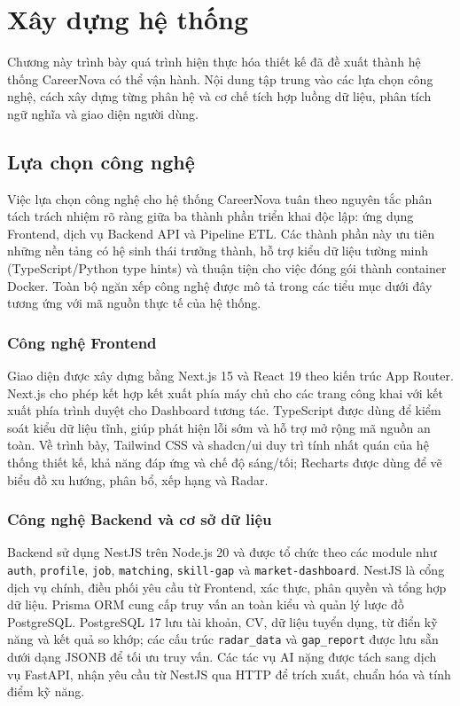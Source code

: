 \chapter{Xây dựng hệ thống}
\label{Chapter4}

Chương này trình bày quá trình hiện thực hóa thiết kế đã đề xuất thành hệ thống CareerNova có thể vận hành. Nội dung tập trung vào các lựa chọn công nghệ, cách xây dựng từng phân hệ và cơ chế tích hợp luồng dữ liệu, phân tích ngữ nghĩa và giao diện người dùng.

\section{Lựa chọn công nghệ}

Việc lựa chọn công nghệ cho hệ thống CareerNova tuân theo nguyên tắc phân tách trách nhiệm rõ ràng giữa ba thành phần triển khai độc lập: ứng dụng Frontend, dịch vụ Backend API và Pipeline ETL. Các thành phần này ưu tiên những nền tảng có hệ sinh thái trưởng thành, hỗ trợ kiểu dữ liệu tường minh (TypeScript/Python type hints) và thuận tiện cho việc đóng gói thành container Docker. Toàn bộ ngăn xếp công nghệ được mô tả trong các tiểu mục dưới đây tương ứng với mã nguồn thực tế của hệ thống.

\subsection{Công nghệ Frontend}

Giao diện được xây dựng bằng Next.js 15 và React 19 theo kiến trúc App Router. Next.js cho phép kết hợp kết xuất phía máy chủ cho các trang công khai với kết xuất phía trình duyệt cho Dashboard tương tác. TypeScript được dùng để kiểm soát kiểu dữ liệu tĩnh, giúp phát hiện lỗi sớm và hỗ trợ mở rộng mã nguồn an toàn. Về trình bày, Tailwind CSS và shadcn/ui duy trì tính nhất quán của hệ thống thiết kế, khả năng đáp ứng và chế độ sáng/tối; Recharts được dùng để vẽ biểu đồ xu hướng, phân bổ, xếp hạng và Radar.

\subsection{Công nghệ Backend và cơ sở dữ liệu}

Backend sử dụng NestJS trên Node.js 20 và được tổ chức theo các module như \texttt{auth}, \texttt{profile}, \texttt{job}, \texttt{matching}, \texttt{skill-gap} và \texttt{market-dashboard}. NestJS là cổng dịch vụ chính, điều phối yêu cầu từ Frontend, xác thực, phân quyền và tổng hợp dữ liệu. Prisma ORM cung cấp truy vấn an toàn kiểu và quản lý lược đồ PostgreSQL. PostgreSQL 17 lưu tài khoản, CV, dữ liệu tuyển dụng, từ điển kỹ năng và kết quả so khớp; các cấu trúc \texttt{radar\_data} và \texttt{gap\_report} được lưu sẵn dưới dạng JSONB để tối ưu truy vấn. Các tác vụ AI nặng được tách sang dịch vụ FastAPI, nhận yêu cầu từ NestJS qua HTTP để trích xuất, chuẩn hóa và tính điểm kỹ năng.


